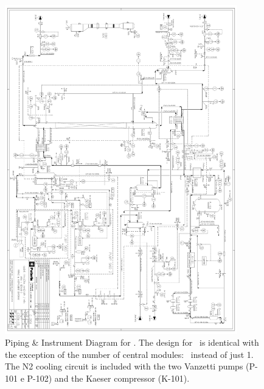 \begin{figure}[!t]
\centering
\includegraphics[width=0.9\textwidth]{./Figures/Aria_Seruci0_column_PID.pdf}
\caption[P\& ID of \Aria\ (II)]{Piping \& Instrument Diagram for \SeruciZero. The design for \SeruciOne\ is identical with the exception of the number of central modules: \AriaCentralModulesNumber\ instead of just 1. The N2 cooling circuit is included with the two Vanzetti pumps (P-101 e P-102) and the Kaeser compressor (K-101).}
\label{fig:Aria-Column-PandID2}
\end{figure}
